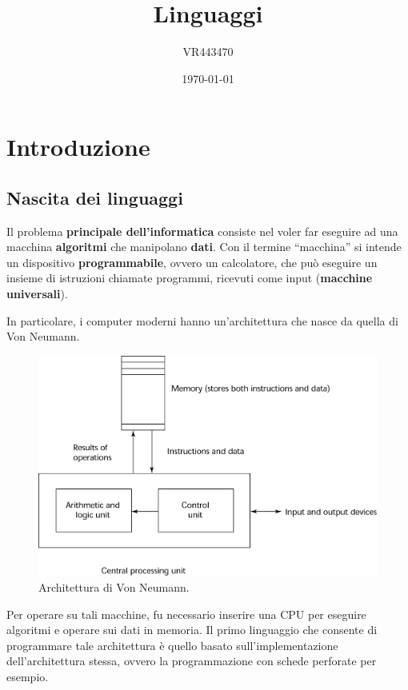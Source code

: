 \documentclass[a4paper]{article}
\newcommand{\dquotes}[1]{``#1''}
\begin{document}
	\author{VR443470}
	\title{Linguaggi}
	\date{\printdayoff\today}
	\maketitle
	
	\newpage
	
	\tableofcontents
	
	\newpage
	
	\section{Introduzione}
	
	\subsection{Nascita dei linguaggi}
	
	Il problema \textbf{principale dell'informatica} consiste nel voler far eseguire ad una macchina \textbf{algoritmi} che manipolano \textbf{dati}. Con il termine \dquotes{macchina} si intende un dispositivo \textbf{programmabile}, ovvero un calcolatore, che può eseguire un insieme di istruzioni chiamate programmi, ricevuti come input (\textcolor{Red3}{\textbf{macchine universali}}).\newline
	
	\noindent
	In particolare, i computer moderni hanno un'architettura che nasce da quella di Von Neumann.
	\begin{figure}[!htp]
		\centering
		\includegraphics[width=\textwidth]{img/von_neumann.png}
		\caption{Architettura di Von Neumann.}
	\end{figure}

	\noindent
	Per operare su tali macchine, fu necessario inserire una CPU per eseguire algoritmi e operare sui dati in memoria. Il primo linguaggio che consente di programmare tale architettura è quello basato sull'implementazione dell'architettura stessa, ovvero la programmazione con schede perforate per esempio.\newpage
	
\end{document}
